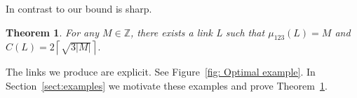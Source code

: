 \documentclass[11pt]{amsart}
\newtheorem{theorem}{Theorem}
\theoremstyle{remark}
\newcommand{\Z}{\mathbb{Z}}
\newcommand{\ceil}[1]{\left\lceil #1 \right\rceil}
\begin{document}
  In contrast to \cite[Theorem 5]{AADG20} our bound is sharp.  %


\begin{theorem}\label{thm:realization}
For any $M\in \Z$,  there exists a link L such that $\mu_{123}(L)=M$ and \(C(L)=2\ceil{\sqrt{3|M|}}.\)\end{theorem} 

The links we produce are explicit.  See Figure~\ref{fig: Optimal example}.  In Section~\ref{sect:examples} we motivate these examples and prove Theorem~\ref{thm:realization}.
\end{document}

